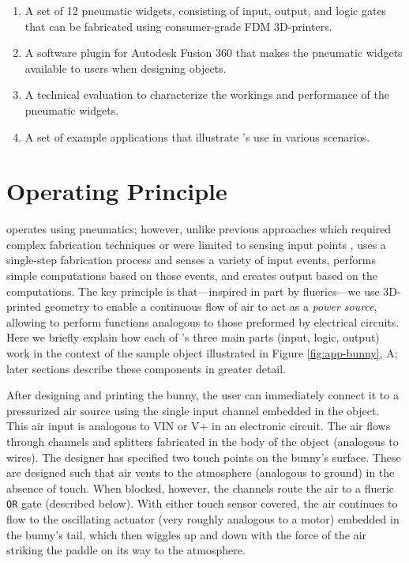     \begin{enumerate}
      \item A set of 12 pneumatic widgets, consisting of input, output, and
        logic gates that can be fabricated using consumer-grade FDM
        3D-printers.
      \item A software plugin for Autodesk Fusion 360 that makes the
          pneumatic widgets available to users when designing
        \al objects.
      \item A technical evaluation to characterize the workings and
        performance of the pneumatic widgets.
      \item A set of example applications that illustrate \al's use
        in various scenarios.
    \end{enumerate}
    
  \section{\al Operating Principle}
    \al operates using pneumatics; however, unlike previous approaches
    which required complex fabrication techniques
    \cite{He:2017,Vazquez:2015,Slyper:2012} or were limited to sensing
    input points \cite{Tejada:2018, Tejada:2020}, \al uses a single-step
    fabrication process and senses a variety of input events, performs
    simple computations based on those events, and creates output based on
    the computations. The key principle is that---inspired in part by
    fluerics---we use 3D-printed geometry to enable a continuous flow of
    air to act as a \textit{power source}, allowing \al to perform
    functions analogous to those preformed by electrical circuits. Here we
    briefly explain how each of \al's three main parts (input, logic,
    output) work in the context of the sample object illustrated in
    Figure \ref{fig:app-bunny}, A; later sections describe these components in
    greater detail.

    After designing and printing the bunny, the user can immediately
    connect it to a pressurized air source using the single input channel
    embedded in the object. This air input is analogous to VIN or V+ in an
    electronic circuit. The air flows through channels and splitters
    fabricated in the body of the object (analogous to wires). The designer
    has specified two touch points on the bunny's surface. These are
    designed such that air vents to the atmosphere (analogous to ground) in
    the absence of touch. When blocked, however, the channels route the air
    to a flueric \texttt{OR} gate (described below). With either touch
    sensor covered, the air continues to flow to the oscillating actuator
    (very roughly analogous to a motor) embedded in the bunny's tail, which
    then wiggles up and down with the force of the air striking the paddle
    on its way to the atmosphere.

